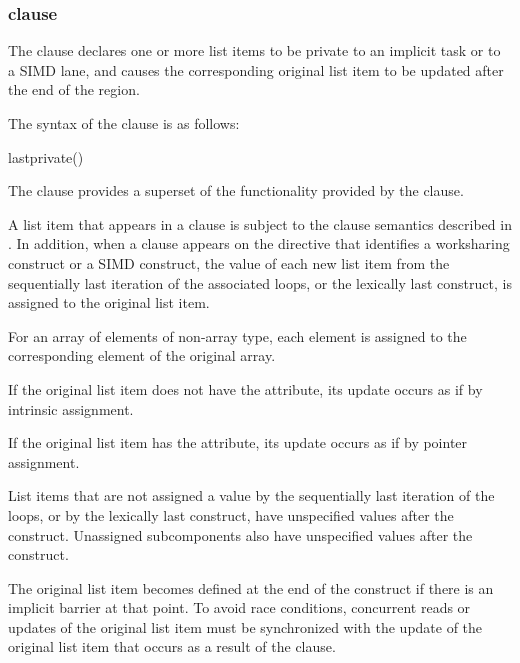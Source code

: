 \subsubsection{ clause}
\label{subsubsec:lastprivate clause}
\summary
The  clause declares one or more list items to be private to an implicit 
task or to a SIMD lane, and causes the corresponding original list item to be updated 
after the end of the region. 

\syntax
The syntax of the  clause is as follows:

\begin{boxedcode}
lastprivate()
\end{boxedcode}

\descr
The  clause provides a superset of the functionality provided by the 
 clause.

A list item that appears in a  clause is subject to the  clause 
semantics described in 
. 
In addition, when a 
 clause appears on the directive that identifies a worksharing construct 
or a SIMD construct, the value of each new list item from the sequentially last iteration 
of the associated loops, or the lexically last  construct, is assigned to the 
original list item. 

\ccppspecificstart
For an array of elements of non-array type, each element is assigned to the 
corresponding element of the original array.
\ccppspecificend
\bigskip

\begin{samepage}
\fortranspecificstart
If the original list item does not have the  attribute, its update occurs as if by 
intrinsic assignment.
\end{samepage}

If the original list item has the  attribute, its update occurs as if by pointer 
assignment.
\fortranspecificend

List items that are not assigned a value by the sequentially last iteration of the loops, or 
by the lexically last  construct, have unspecified values after the construct. 
Unassigned subcomponents also have unspecified values after the construct.

The original list item becomes defined at the end of the construct if there is an implicit 
barrier at that point. To avoid race conditions, concurrent reads or updates of the original 
list item must be synchronized with the update of the original list item that occurs as a 
result of the  clause.

